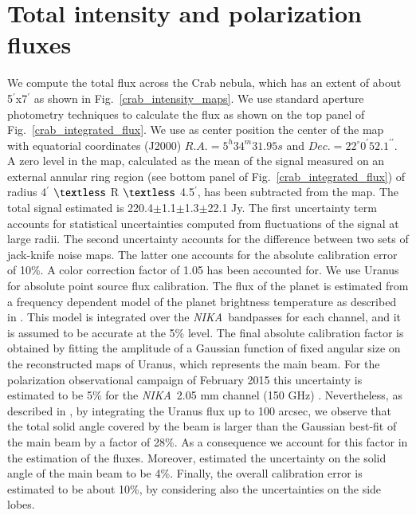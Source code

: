 \documentclass[twocolumn,traditabstract]{aa}
\def\NIKA{\textit{NIKA}}
\begin{document}
\section{Total intensity and polarization fluxes}\label{sec:Polarization estimates in CMB experiments like beams}
We compute the total flux across the Crab nebula, which has an extent of about
5$^{\prime}$x7$^{\prime}$ as shown in Fig.~\ref{crab_intensity_maps}.  We use
standard aperture photometry techniques to calculate the flux as shown on the top panel of
Fig.~\ref{crab_integrated_flux}. We use as center position the center of the
map with equatorial coordinates (J2000) $R.A. = 5^h34^m31.95s$ and $Dec. = 22^{\circ}0^{\prime}52.1^{\prime\prime}$. A zero level in the map, calculated as the mean of the signal measured on
an external annular ring region (see bottom panel of
Fig.~\ref{crab_integrated_flux}) of radius 4$^\prime$ $\textless$ R $\textless$
4.5$^\prime$, has been subtracted from the map. The total signal estimated is
220.4$\pm$1.1$\pm$1.3$\pm$22.1 Jy. The first uncertainty term accounts for statistical
uncertainties computed from fluctuations of the signal at large radii. The second uncertainty accounts for the difference between two sets of jack-knife noise maps. The latter one accounts for the absolute calibration error of 10\%. A color correction factor of 1.05 has been accounted for.
We use Uranus for absolute point source flux calibration. The flux of the planet is estimated from a frequency dependent model of the planet brightness temperature as described in \cite{moreno2010}. 
This model is integrated over the \NIKA\ bandpasses for each channel, and it is assumed to be accurate at the 5\% level. The final absolute calibration factor is obtained by fitting the amplitude of a Gaussian function of fixed angular size on the reconstructed maps of Uranus, which represents the main beam. For the polarization observational campaign of February 2015 this uncertainty is estimated to be 5\% for the \NIKA\ 2.05 mm channel (150 GHz) \citep{ritacco2017}. 
Nevertheless, as described in \cite{adam2013, catalano2014}, by integrating the Uranus flux up to 100 arcsec, we observe that the total solid angle covered by the beam is larger than the Gaussian best-fit of the main beam by a factor of 28\%. As a consequence we account for this factor in the estimation of the fluxes.
Moreover, \cite{adam2013} estimated the uncertainty on the solid angle of the main beam to be 4\%.
Finally, the overall calibration error is estimated to be about 10\%, by considering also the uncertainties on the side lobes.
\end{document}
